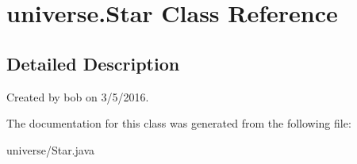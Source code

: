 \hypertarget{classuniverse_1_1_star}{}\section{universe.\+Star Class Reference}
\label{classuniverse_1_1_star}


\subsection{Detailed Description}
Created by bob on 3/5/2016. 

The documentation for this class was generated from the following file\+:\begin{DoxyCompactItemize}
\item 
universe/Star.\+java\end{DoxyCompactItemize}
